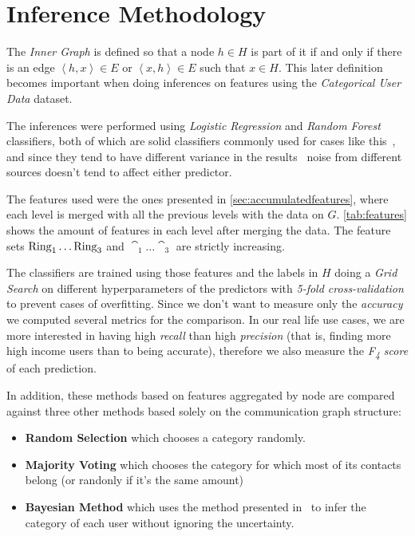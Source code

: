 \section{Inference Methodology}
\label{sec:inference_methodology}

The \emph{Inner Graph} is defined so that a node $h \in H$ is part of it if and only if there is an edge $\left< h, x \right> \in E$ or $\left< x, h \right> \in E$ such that $x \in H$.
This later definition becomes important when doing inferences on features using the \emph{Categorical User Data} dataset.


The inferences were performed using \emph{Logistic Regression} and \emph{Random Forest} classifiers, both of which are solid classifiers commonly used for cases like this~\cite{binaryevaluation}, and since they tend to have different variance in the results~\cite{ting2016} noise from different sources doesn't tend to affect either predictor.

The features used were the ones presented in \cref{sec:accumulatedfeatures}, where each level is merged with all the previous levels with the data on $G$. \cref{tab:features} shows the amount of features in each level after merging the data. 
The feature sets $\operatorname{Ring}_1 \ldots \operatorname{Ring}_3$ and $\cat_1 \ldots \cat_3$ are strictly
increasing.

The classifiers are trained using those features and the labels in $H$ doing a \emph{Grid Search} on different hyperparameters of the predictors with \emph{5-fold cross-validation} to prevent cases of overfitting. Since we don't want to measure only the \emph{accuracy} we computed several metrics for the comparison. In our real life use cases, we are more interested in having high \emph{recall} than high \emph{precision} (that is, finding more high income users than to being accurate), therefore we also measure the \emph{F\textsubscript{4} score} of each prediction.

In addition, these methods based on features aggregated by node are compared against three other methods based solely on the communication graph structure:

\begin{itemize}
	\item \textbf{Random Selection} which chooses a category randomly.
	\item \textbf{Majority Voting} which chooses the category for which most of its contacts belong (or randonly if it's the same amount)
	\item \textbf{Bayesian Method} which uses the method presented in~\cite{fixmanasonam2016} to infer the category of each user without ignoring the uncertainty.
\end{itemize}
